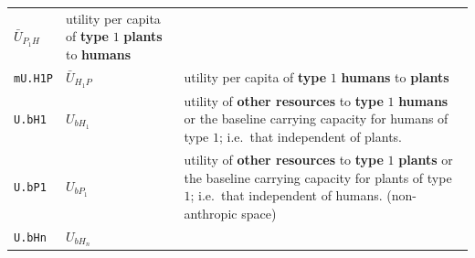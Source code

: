 \documentclass[]{book}
\begin{document}
\begin{longtable}[]{@{}lll@{}}
\begin{minipage}[t]{0.25\columnwidth}
\(\bar{U}_{P_{1}H}\)\strut
\end{minipage} & \begin{minipage}[t]{0.40\columnwidth}\raggedright
utility per capita of \textbf{type} \(1\) \textbf{plants} to \textbf{humans}\strut
\end{minipage}\tabularnewline
\begin{minipage}[t]{0.27\columnwidth}\raggedright
\texttt{mU.H1P}\strut
\end{minipage} & \begin{minipage}[t]{0.25\columnwidth}\raggedright
\(\bar{U}_{H_{1}P}\)\strut
\end{minipage} & \begin{minipage}[t]{0.40\columnwidth}\raggedright
utility per capita of \textbf{type} \(1\) \textbf{humans} to \textbf{plants}\strut
\end{minipage}\tabularnewline
\begin{minipage}[t]{0.27\columnwidth}\raggedright
\texttt{U.bH1}\strut
\end{minipage} & \begin{minipage}[t]{0.25\columnwidth}\raggedright
\(U_{bH_{1}}\)\strut
\end{minipage} & \begin{minipage}[t]{0.40\columnwidth}\raggedright
utility of \textbf{other resources} to \textbf{type} \(1\) \textbf{humans} or the baseline carrying capacity for humans of type \(1\); i.e.~that independent of plants.\strut
\end{minipage}\tabularnewline
\begin{minipage}[t]{0.27\columnwidth}\raggedright
\texttt{U.bP1}\strut
\end{minipage} & \begin{minipage}[t]{0.25\columnwidth}\raggedright
\(U_{bP_{1}}\)\strut
\end{minipage} & \begin{minipage}[t]{0.40\columnwidth}\raggedright
utility of \textbf{other resources} to \textbf{type} \(1\) \textbf{plants} or the baseline carrying capacity for plants of type \(1\); i.e.~that independent of humans. (non-anthropic space)\strut
\end{minipage}\tabularnewline
\begin{minipage}[t]{0.27\columnwidth}\raggedright
\texttt{U.bHn}\strut
\end{minipage} & \begin{minipage}[t]{0.25\columnwidth}\raggedright
\(U_{bH_{n}}\)\strut
\end{minipage} & \begin{minipage}[t]{0.40\columnwidth}\raggedright

\end{minipage}
\end{longtable}
\end{document}
